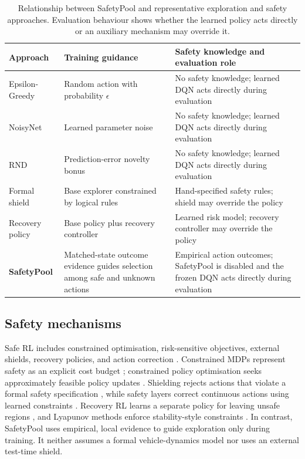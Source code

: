 \documentclass[runningheads]{llncs}
\begin{document}
\begin{table}[H]
\caption{Relationship between SafetyPool and representative exploration and safety approaches. Evaluation behaviour shows whether the learned policy acts directly or an auxiliary mechanism may override it.}
\label{tab:related}
\raggedright
\setlength{\tabcolsep}{4pt}
\begin{tabular}{p{1.8cm}p{3.8cm}p{4.8cm}}
\toprule
Approach & Training guidance & Safety knowledge and evaluation role \\
\midrule
Epsilon-Greedy & Random action with probability $\epsilon$ & No safety knowledge; learned DQN acts directly during evaluation \\
NoisyNet & Learned parameter noise & No safety knowledge; learned DQN acts directly during evaluation \\
RND & Prediction-error novelty bonus & No safety knowledge; learned DQN acts directly during evaluation \\
Formal shield & Base explorer constrained by logical rules & Hand-specified safety rules; shield may override the policy \\
Recovery policy & Base policy plus recovery controller & Learned risk model; recovery controller may override the policy \\
\textbf{SafetyPool} & Matched-state outcome evidence guides selection among safe and unknown actions & Empirical action outcomes; SafetyPool is disabled and the frozen DQN acts directly during evaluation \\
\bottomrule
\end{tabular}
\end{table}

\subsection{Safety mechanisms}

Safe RL includes constrained optimisation, risk-sensitive objectives, external shields, recovery policies, and action correction \cite{garcia2015safe}. Constrained MDPs represent safety as an explicit cost budget \cite{altman1999cmdp}; constrained policy optimisation seeks approximately feasible policy updates \cite{achiam2017cpo}. Shielding rejects actions that violate a formal safety specification \cite{alshiekh2018shielding}, while safety layers correct continuous actions using learned constraints \cite{dalal2018safetylayer}. Recovery RL learns a separate policy for leaving unsafe regions \cite{thananjeyan2021recovery}, and Lyapunov methods enforce stability-style constraints \cite{chow2018lyapunov}. In contrast, SafetyPool uses empirical, local evidence to guide exploration only during training. It neither assumes a formal vehicle-dynamics model nor uses an external test-time shield.
\end{document}
